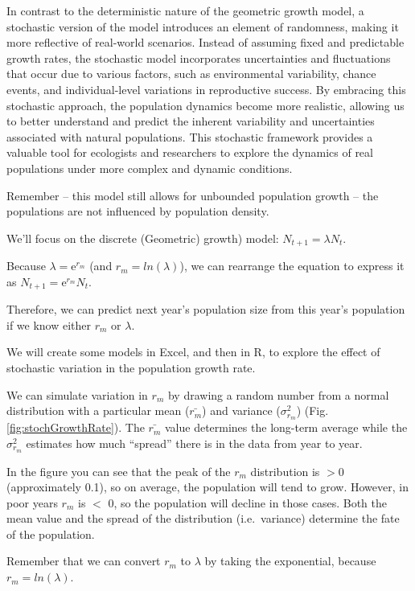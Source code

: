 \documentclass[
  a4paper]{book}
\begin{document}
In contrast to the deterministic nature of the geometric growth model, a stochastic version of the model introduces an element of randomness, making it more reflective of real-world scenarios. Instead of assuming fixed and predictable growth rates, the stochastic model incorporates uncertainties and fluctuations that occur due to various factors, such as environmental variability, chance events, and individual-level variations in reproductive success. By embracing this stochastic approach, the population dynamics become more realistic, allowing us to better understand and predict the inherent variability and uncertainties associated with natural populations. This stochastic framework provides a valuable tool for ecologists and researchers to explore the dynamics of real populations under more complex and dynamic conditions.

Remember -- this model still allows for unbounded population growth -- the populations are not influenced by population density.

We'll focus on the discrete (Geometric) growth) model: \(N_{t+1}=\lambda N_t\).

Because \(\lambda = \mathrm{e}^{r_m}\) (and \(r_m = ln(\lambda)\)), we can rearrange the equation to express it as \(N_{t+1}=\mathrm{e}^{r_m} N_t\).

Therefore, we can predict next year's population size from this year's population if we know either \(r_m\) or \(\lambda\).

We will create some models in Excel, and then in R, to explore the effect of stochastic variation in the population growth rate.

We can simulate variation in \(r_m\) by drawing a random number from a normal distribution with a particular mean (\(\bar{r_m}\)) and variance (\(\sigma_{r_m}^2\)) (Fig. \ref{fig:stochGrowthRate}). The \(\bar{r_m}\) value determines the long-term average while the \(\sigma_{r_m}^2\) estimates how much ``spread'' there is in the data from year to year.

In the figure you can see that the peak of the \(r_m\) distribution is \(>0\) (approximately 0.1), so on average, the population will tend to grow. However, in poor years \(r_m\) is \(<\) 0, so the population will decline in those cases. Both the mean value and the spread of the distribution (i.e.~variance) determine the fate of the population.

Remember that we can convert \(r_m\) to \(\lambda\) by taking the exponential, because \(r_m = ln(\lambda)\).
\end{document}
